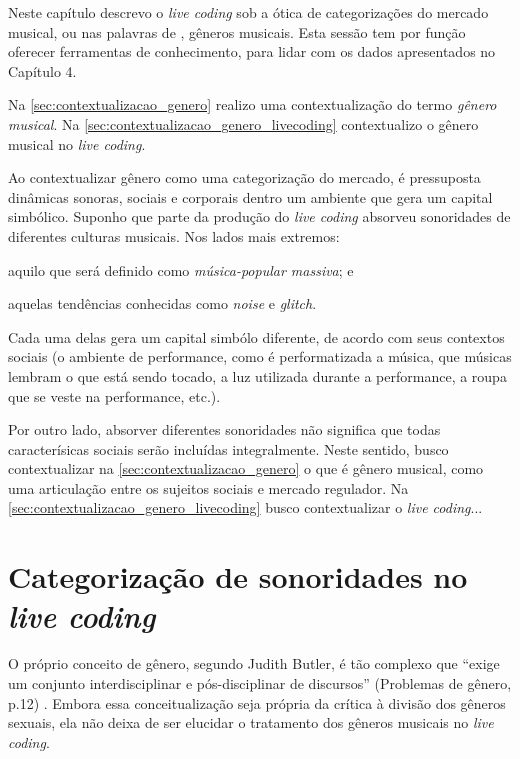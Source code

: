 Neste capítulo descrevo o \emph{live coding} sob a ótica de categorizações do mercado musical, ou nas palavras de \cite{janotti_jr._a_2003,sa_musica_2006,sa_se_2009}, gêneros musicais. Esta sessão tem por função oferecer ferramentas de conhecimento, para lidar com os dados apresentados no Capítulo 4.

Na \autoref{sec:contextualizacao_genero} realizo uma contextualização do termo \emph{gênero musical}. Na \autoref{sec:contextualizacao_genero_livecoding} contextualizo o gênero musical no \emph{live coding}. 

Ao contextualizar gênero como uma categorização do mercado, é pressuposta dinâmicas sonoras, sociais e corporais dentro um ambiente que gera um capital simbólico. Suponho que parte da produção do \emph{live coding} absorveu  sonoridades de diferentes culturas musicais. Nos lados mais extremos:\begin{inparaenum}
\item aquilo que será  definido como \emph{música-popular massiva}; e 
\item aquelas tendências conhecidas como \emph{noise} e \emph{glitch}.
\end{inparaenum} Cada uma delas gera um capital simbólo diferente, de acordo com seus contextos sociais (o ambiente de performance, como é performatizada a música, que músicas lembram o que está sendo tocado, a luz utilizada durante a performance, a roupa que se veste na performance, etc.).

Por outro lado, absorver diferentes sonoridades não significa que todas caracterísicas sociais serão incluídas integralmente. Neste sentido, busco contextualizar na \autoref{sec:contextualizacao_genero} o que é gênero musical, como uma articulação entre os sujeitos sociais e mercado regulador. Na \autoref{sec:contextualizacao_genero_livecoding} busco contextualizar o \emph{live coding}...


\section{Categorização de sonoridades no \emph{live coding}}\label{sec:categoriza_som}

O próprio conceito de gênero, segundo Judith Butler, é tão complexo que ``exige um conjunto interdisciplinar e pós-disciplinar de discursos'' (Problemas de gênero, p.12) . Embora essa conceitualização seja própria da crítica à divisão dos gêneros sexuais, ela não deixa de ser elucidar o tratamento dos gêneros musicais no \emph{live coding}.


